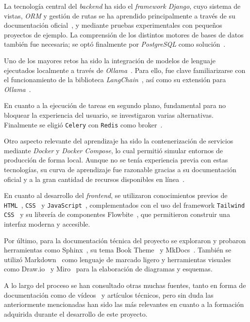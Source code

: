La tecnología central del \textit{backend} ha sido el \textit{framework Django}, cuyo sistema de vistas, \textit{ORM} y gestión de rutas se ha aprendido principalmente a través de su documentación oficial~\cite{web:django,web:django-orm}, y mediante pruebas experimentales con pequeños proyectos de ejemplo. La comprensión de los distintos motores de bases de datos también fue necesaria; se optó finalmente por \textit{PostgreSQL} como solución~\cite{web:postgresql}.

Uno de los mayores retos ha sido la integración de modelos de lenguaje ejecutados localmente a través de \textit{Ollama}~\cite{web:ollama}. Para ello, fue clave familiarizarse con el funcionamiento de la biblioteca \textit{LangChain}~\cite{web:langchain}, así como su extensión para \textit{Ollama}~\cite{web:langchain-ollama}.

En cuanto a la ejecución de tareas en segundo plano, fundamental para no bloquear la experiencia del usuario, se investigaron varias alternativas. Finalmente se eligió \texttt{Celery} con \texttt{Redis} como broker~\cite{web:celery,web:redis}.

Otro aspecto relevante del aprendizaje ha sido la contenerización de servicios mediante \textit{Docker} y \textit{Docker Compose}, lo cual permitió simular entornos de producción de forma local. Aunque no se tenía experiencia previa con estas tecnologías, su curva de aprendizaje fue razonable gracias a su documentación oficial y a la gran cantidad de recursos disponibles en línea~\cite{web:docker_doc}.

En cuanto al desarrollo del \textit{frontend}, se utilizaron conocimientos previos de \texttt{HTML}~\cite{web:html}, \texttt{CSS}~\cite{web:css} y \texttt{JavaScript}~\cite{web:javascript}, complementados con el uso del framework \texttt{Tailwind CSS}~\cite{web:tailwind} y su librería de componentes Flowbite~\cite{web:flowbite}, que permitieron construir una interfaz moderna y accesible.

Por último, para la documentación técnica del proyecto se exploraron y probaron herramientas como Sphinx~\cite{web:sphinx}, su tema Book Theme~\cite{web:sphinxbooktheme} y MkDocs~\cite{web:mkdocs}. También se utilizó Markdown~\cite{web:markdown} como lenguaje de marcado ligero y herramientas visuales como Draw.io~\cite{web:drawio} y Miro~\cite{web:miro} para la elaboración de diagramas y esquemas.

A lo largo del proceso se han consultado otras muchas fuentes, tanto en forma de documentación como de vídeos~\cite{web:django-curso-youtube,web:django-curso-youtube-pildoras} y artículos técnicos, pero sin duda las anteriormente mencionadas han sido las más relevantes en cuanto a la formación adquirida durante el desarrollo de este proyecto.

